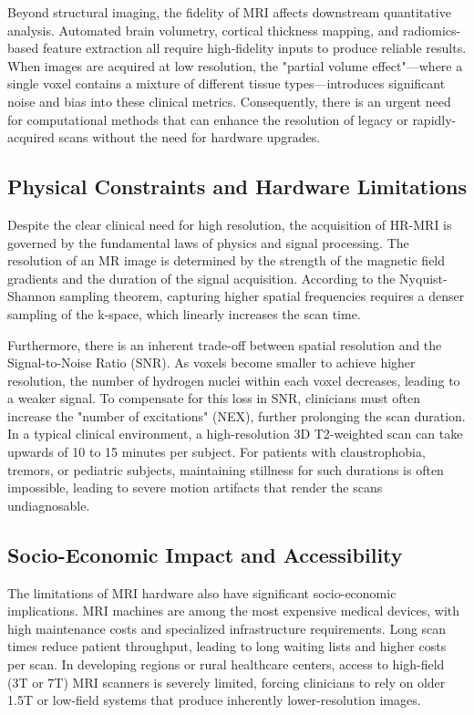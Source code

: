 \documentclass{IEEEoj}
\begin{document}
Beyond structural imaging, the fidelity of MRI affects downstream quantitative analysis. Automated brain volumetry, cortical thickness mapping, and radiomics-based feature extraction all require high-fidelity inputs to produce reliable results. When images are acquired at low resolution, the "partial volume effect"—where a single voxel contains a mixture of different tissue types—introduces significant noise and bias into these clinical metrics. Consequently, there is an urgent need for computational methods that can enhance the resolution of legacy or rapidly-acquired scans without the need for hardware upgrades.

\subsection{Physical Constraints and Hardware Limitations}
Despite the clear clinical need for high resolution, the acquisition of HR-MRI is governed by the fundamental laws of physics and signal processing. The resolution of an MR image is determined by the strength of the magnetic field gradients and the duration of the signal acquisition. According to the Nyquist-Shannon sampling theorem, capturing higher spatial frequencies requires a denser sampling of the k-space, which linearly increases the scan time.

Furthermore, there is an inherent trade-off between spatial resolution and the Signal-to-Noise Ratio (SNR). As voxels become smaller to achieve higher resolution, the number of hydrogen nuclei within each voxel decreases, leading to a weaker signal. To compensate for this loss in SNR, clinicians must often increase the "number of excitations" (NEX), further prolonging the scan duration. In a typical clinical environment, a high-resolution 3D T2-weighted scan can take upwards of 10 to 15 minutes per subject. For patients with claustrophobia, tremors, or pediatric subjects, maintaining stillness for such durations is often impossible, leading to severe motion artifacts that render the scans undiagnosable.

\subsection{Socio-Economic Impact and Accessibility}
The limitations of MRI hardware also have significant socio-economic implications. MRI machines are among the most expensive medical devices, with high maintenance costs and specialized infrastructure requirements. Long scan times reduce patient throughput, leading to long waiting lists and higher costs per scan. In developing regions or rural healthcare centers, access to high-field (3T or 7T) MRI scanners is severely limited, forcing clinicians to rely on older 1.5T or low-field systems that produce inherently lower-resolution images.
\end{document}
